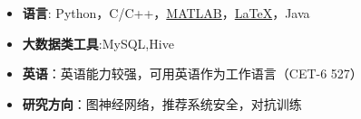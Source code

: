   \begin{itemize}[leftmargin=*]
    \item \textbf{语言}: Python，C/C++，\href{https://www.mathworks.com/}{MATLAB}，\href{https://www.latex-project.org/}{\LaTeX}，Java
   \item \textbf{大数据类工具}:MySQL,Hive
    \item \textbf{英语}：英语能力较强，可用英语作为工作语言（CET-6 527）
	\item \textbf{研究方向}：图神经网络，推荐系统安全，对抗训练
  \end{itemize}